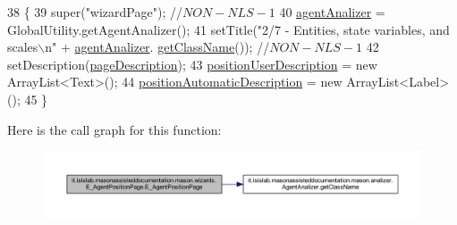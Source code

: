 \begin{DoxyCode}
38                                  \{
39         super(\textcolor{stringliteral}{"wizardPage"}); \textcolor{comment}{//$NON-NLS-1$}
40         \hyperlink{classit_1_1isislab_1_1masonassisteddocumentation_1_1mason_1_1wizards_1_1_e___agent_position_page_a2fe88598fc7248012ccf5298134f0196}{agentAnalizer} = GlobalUtility.getAgentAnalizer();
41         setTitle(\textcolor{stringliteral}{"2/7 - Entities, state variables, and scales\(\backslash\)n"} + \hyperlink{classit_1_1isislab_1_1masonassisteddocumentation_1_1mason_1_1wizards_1_1_e___agent_position_page_a2fe88598fc7248012ccf5298134f0196}{agentAnalizer}.
      \hyperlink{classit_1_1isislab_1_1masonassisteddocumentation_1_1mason_1_1analizer_1_1_agent_analizer_a94492199c5e4873a07a2a46d15617937}{getClassName}()); \textcolor{comment}{//$NON-NLS-1$}
42         setDescription(\hyperlink{classit_1_1isislab_1_1masonassisteddocumentation_1_1mason_1_1wizards_1_1_e___agent_position_page_a4737c08bab7788fba36663a11bf367fa}{pageDescription});
43         \hyperlink{classit_1_1isislab_1_1masonassisteddocumentation_1_1mason_1_1wizards_1_1_e___agent_position_page_a09e8462701fa4668917f97c2c2703a2c}{positionUserDescription} = \textcolor{keyword}{new} ArrayList<Text>();
44         \hyperlink{classit_1_1isislab_1_1masonassisteddocumentation_1_1mason_1_1wizards_1_1_e___agent_position_page_a3897e4e6c9669b071dccebca53188b08}{positionAutomaticDescription} = \textcolor{keyword}{new} ArrayList<Label>();
45     \}
\end{DoxyCode}


Here is the call graph for this function\-:
\nopagebreak
\begin{figure}[H]
\begin{center}
\leavevmode
\includegraphics[width=350pt]{classit_1_1isislab_1_1masonassisteddocumentation_1_1mason_1_1wizards_1_1_e___agent_position_page_a760dd943747cb5b179c21dee2718b687_cgraph}
\end{center}
\end{figure}




